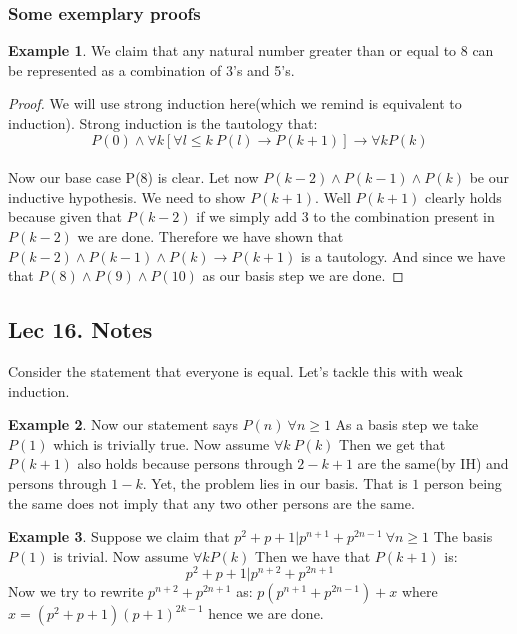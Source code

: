 \documentclass[titlepage]{article}
\theoremstyle{definition}
\newtheorem{example}{Example}
\numberwithin{equation}{subsection}
\numberwithin{remark}{subsection}
\begin{document}
\subsubsection{Some exemplary proofs}

\begin{example}
We claim that any natural number greater than or equal to 8 can be represented as a combination of 3's and 5's.
\end{example}

\begin{proof}
We will use strong induction here(which we remind is equivalent to induction). Strong induction is the tautology that:
$$ P(0) \land \forall k[\forall l \leq k \ P(l) \rightarrow P(k+1)] \rightarrow \forall k P(k)$$
\\
Now our base case P(8) is clear. Let now $P(k-2)\land P(k-1)\land P(k)$ be our inductive hypothesis. We need to show $P(k+1)$. Well $P(k+1)$ clearly holds because given that $P(k-2)$ if we simply add 3 to the combination present in $P(k-2)$ we are done. Therefore we have shown that $P(k-2)\land P(k-1)\land P(k) \rightarrow P(k+1)$ is a tautology. And since we have that $P(8) \land P(9) \land P(10)$ as our basis step we are done.
\end{proof}

\subsection{Lec 16. Notes}

Consider the statement that everyone is equal. Let's tackle this with weak induction. 

\begin{example}
Now our statement says $P(n) \ \forall n \geq 1$ As a basis step we take $P(1)$ which is trivially true. Now assume $\forall k \ P(k)$ Then we get that $P(k+1)$ also holds because persons through $2 - k+1$ are the same(by IH) and persons through $1 - k$. Yet, the problem lies in our basis. That is $1$ person being the same does not imply that any two other persons are the same. 
\end{example}

\begin{example}
Suppose we claim that $p^2 + p + 1 | p^{n+1} + p^{2n-1} \ \forall n\geq1$ The basis $P(1)$ is trivial. Now assume $\forall k P(k)$ Then we have that $P(k+1)$ is:
$$p^2 + p + 1 | p^{n+2} + p^{2n+1}$$ Now we try to rewrite $p^{n+2} + p^{2n+1}$ as:
$ p(p^{n+1} + p^{2n-1}) + x $ where $x = (p^2 + p + 1)(p+1)^{2k-1}$ hence we are done.
\end{example}
\end{document}
